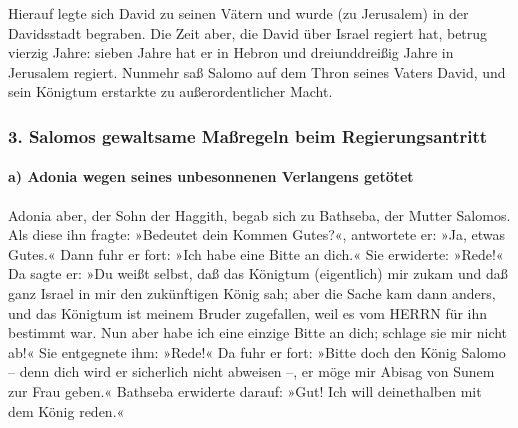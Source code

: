 Hierauf legte sich David zu seinen Vätern und wurde (zu
Jerusalem) in der Davidsstadt begraben. Die Zeit aber,
die David über Israel regiert hat, betrug vierzig Jahre: sieben Jahre
hat er in Hebron und dreiunddreißig Jahre in Jerusalem regiert.
Nunmehr saß Salomo auf dem Thron seines Vaters David, und
sein Königtum erstarkte zu außerordentlicher Macht.

\hypertarget{salomos-gewaltsame-mauxdfregeln-beim-regierungsantritt}{%
\subsubsection{3. Salomos gewaltsame Maßregeln beim
Regierungsantritt}\label{salomos-gewaltsame-mauxdfregeln-beim-regierungsantritt}}

\hypertarget{a-adonia-wegen-seines-unbesonnenen-verlangens-getuxf6tet}{%
\paragraph{a) Adonia wegen seines unbesonnenen Verlangens
getötet}\label{a-adonia-wegen-seines-unbesonnenen-verlangens-getuxf6tet}}

Adonia aber, der Sohn der Haggith, begab sich zu
Bathseba, der Mutter Salomos. Als diese ihn fragte: »Bedeutet dein
Kommen Gutes?«, antwortete er: »Ja, etwas Gutes.« Dann
fuhr er fort: »Ich habe eine Bitte an dich.« Sie erwiderte: »Rede!«
Da sagte er: »Du weißt selbst, daß das Königtum
(eigentlich) mir zukam und daß ganz Israel in mir den zukünftigen König
sah; aber die Sache kam dann anders, und das Königtum ist meinem Bruder
zugefallen, weil es vom HERRN für ihn bestimmt war. Nun
aber habe ich eine einzige Bitte an dich; schlage sie mir nicht ab!« Sie
entgegnete ihm: »Rede!« Da fuhr er fort: »Bitte doch den
König Salomo -- denn dich wird er sicherlich nicht abweisen --, er möge
mir Abisag von Sunem zur Frau geben.« Bathseba erwiderte
darauf: »Gut! Ich will deinethalben mit dem König reden.«

